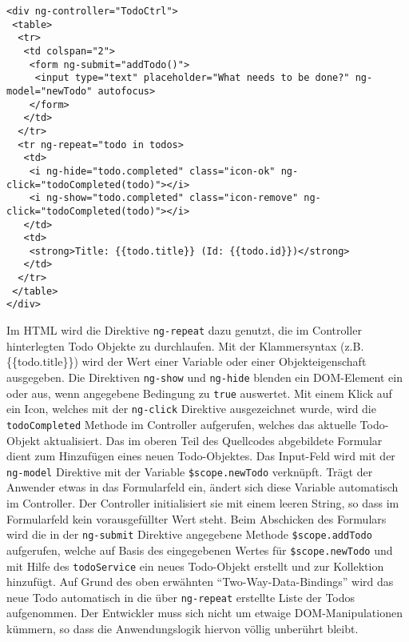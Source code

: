 \begin{lstlisting}
<div ng-controller="TodoCtrl">
 <table>
  <tr>
   <td colspan="2">
    <form ng-submit="addTodo()">
     <input type="text" placeholder="What needs to be done?" ng-model="newTodo" autofocus>
    </form>
   </td>
  </tr>
  <tr ng-repeat="todo in todos>
   <td>
    <i ng-hide="todo.completed" class="icon-ok" ng-click="todoCompleted(todo)"></i>
    <i ng-show="todo.completed" class="icon-remove" ng-click="todoCompleted(todo)"></i>
   </td>
   <td>
    <strong>Title: {{todo.title}} (Id: {{todo.id}})</strong>
   </td>
  </tr>
 </table>
</div>
\end{lstlisting}
Im \ac{HTML} wird die Direktive \texttt{ng-repeat} dazu genutzt, die im Controller hinterlegten Todo Objekte zu durchlaufen. Mit der Klammersyntax (z.B. \{\{todo.title\}\}) wird der Wert einer Variable oder einer Objekteigenschaft ausgegeben. Die Direktiven \texttt{ng-show} und \texttt{ng-hide} blenden ein \ac{DOM}-Element ein oder aus, wenn angegebene Bedingung zu \texttt{true} auswertet. Mit einem Klick auf ein Icon, welches mit der \texttt{ng-click} Direktive ausgezeichnet wurde, wird die \texttt{todoCompleted} Methode im Controller aufgerufen, welches das aktuelle Todo-Objekt aktualisiert. Das im oberen Teil des Quellcodes abgebildete Formular dient zum Hinzufügen eines neuen Todo-Objektes. Das Input-Feld wird mit der \texttt{ng-model} Direktive mit der Variable \texttt{\$scope.newTodo} verknüpft. Trägt der Anwender etwas in das Formularfeld ein, ändert sich diese Variable automatisch im Controller. Der Controller initialisiert sie mit einem leeren String, so dass im Formularfeld kein vorausgefüllter Wert steht. Beim Abschicken des Formulars wird die in der \texttt{ng-submit} Direktive angegebene Methode \texttt{\$scope.addTodo} aufgerufen, welche auf Basis des eingegebenen Wertes für \texttt{\$scope.newTodo} und mit Hilfe des \texttt{todoService} ein neues Todo-Objekt erstellt und zur Kollektion hinzufügt. Auf Grund des oben erwähnten "`Two-Way-Data-Bindings"' wird das neue Todo automatisch in die über \texttt{ng-repeat} erstellte Liste der Todos aufgenommen. Der Entwickler muss sich nicht um etwaige \ac{DOM}-Manipulationen kümmern, so dass die Anwendungslogik hiervon völlig unberührt bleibt.


